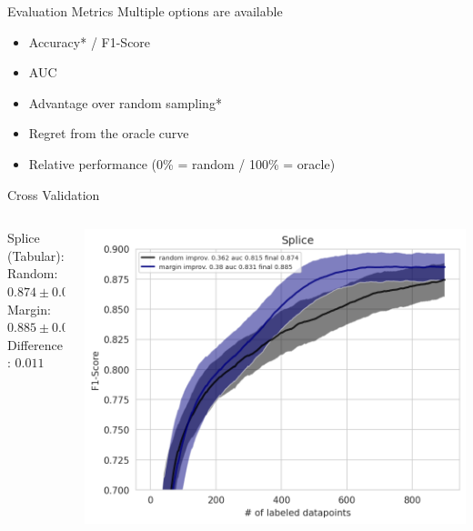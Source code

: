 \documentclass[aspectratio=169, 11pt, invertlogo]{ismll-slides}
\begin{document}

\begin{frame}[fragile]{Evaluation Metrics}
	Multiple options are available
	\begin{itemize}
		\item Accuracy* / F1-Score
		\item AUC
		\item Advantage over random sampling*
		\item Regret from the oracle curve
		\item Relative performance (0\% = random / 100\% = oracle)
	\end{itemize}
\end{frame}


\begin{frame}[fragile]{Cross Validation}
	\begin{columns}
		\begin{column}{0.3\linewidth}
			Splice (Tabular): \\
			Random: $0.874 \pm 0.01$ \\
			Margin: $0.885 \pm 0.015$ \\
			Difference: $0.011$
		\end{column}
		\hspace{3mm}
		\begin{column}{0.7\linewidth}
			\includegraphics[width=0.9\linewidth]{pics/splice_performance.png}
		\end{column}
	\end{columns}
	
\end{frame}
\end{document}
